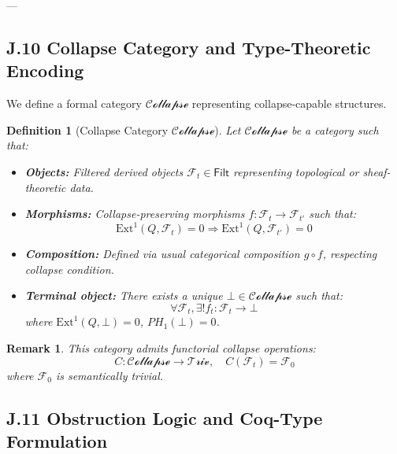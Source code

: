 \documentclass[11pt]{article}
\newtheorem{definition}[theorem]{Definition}
\newtheorem{remark}[theorem]{Remark}
\begin{document}
\begin{axiom}
\begin{axiom}
---


\subsection*{J.10 Collapse Category and Type-Theoretic Encoding}

We define a formal category \(\mathcal{Collapse}\) representing collapse-capable structures.

\begin{definition}[Collapse Category \(\mathcal{Collapse}\)]
Let \(\mathcal{Collapse}\) be a category such that:
\begin{itemize}
  \item \textbf{Objects:} Filtered derived objects \(\mathcal{F}_t \in \mathsf{Filt}\) representing topological or sheaf-theoretic data.
  \item \textbf{Morphisms:} Collapse-preserving morphisms \(f: \mathcal{F}_t \to \mathcal{F}_{t'}\) such that:
    \[
    \mathrm{Ext}^1(Q, \mathcal{F}_t) = 0 \Rightarrow \mathrm{Ext}^1(Q, \mathcal{F}_{t'}) = 0
    \]
  \item \textbf{Composition:} Defined via usual categorical composition \(g \circ f\), respecting collapse condition.
  \item \textbf{Terminal object:} There exists a unique \(\bot \in \mathcal{Collapse}\) such that:
    \[
    \forall \mathcal{F}_t, \exists! f_t : \mathcal{F}_t \to \bot
    \]
    where \(\mathrm{Ext}^1(Q, \bot) = 0\), \(PH_1(\bot) = 0\).
\end{itemize}
\end{definition}

\begin{remark}
This category admits functorial collapse operations:
\[
C: \mathcal{Collapse} \to \mathcal{Triv}, \quad C(\mathcal{F}_t) = \mathcal{F}_0
\]
where \(\mathcal{F}_0\) is semantically trivial.
\end{remark}


\subsection*{J.11 Obstruction Logic and Coq-Type Formulation}


\end{axiom}
\end{axiom}
\end{document}
